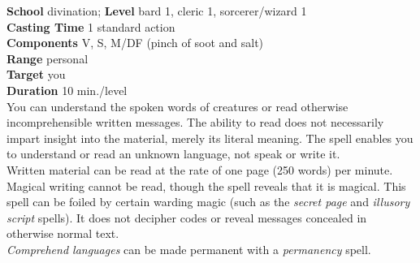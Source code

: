 \textbf{School} divination; \textbf{Level} bard 1, cleric 1, sorcerer/wizard 1\\
\textbf{Casting Time} 1 standard action\\
\textbf{Components} V, S, M/DF (pinch of soot and salt)\\
\textbf{Range} personal\\
\textbf{Target} you\\
\textbf{Duration} 10 min./level\\
You can understand the spoken words of creatures or read otherwise incomprehensible written messages. The ability to read does not necessarily impart insight into the material, merely its literal meaning. The spell enables you to understand or read an unknown language, not speak or write it.\\
Written material can be read at the rate of one page (250 words) per minute. Magical writing cannot be read, though the spell reveals that it is magical. This spell can be foiled by certain warding magic (such as the \textit{secret page }and \textit{illusory script }spells). It does not decipher codes or reveal messages concealed in otherwise normal text.\\
\textit{Comprehend languages }can be made permanent with a \textit{permanency }spell.\\

